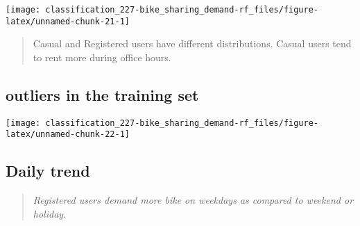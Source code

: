 \documentclass[]{book}
\newenvironment{Shaded}{\begin{snugshade}}{\end{snugshade}}
\newcommand{\CommentTok}[1]{\textcolor[rgb]{0.56,0.35,0.01}{\textit{#1}}}
\newcommand{\DataTypeTok}[1]{\textcolor[rgb]{0.13,0.29,0.53}{#1}}
\newcommand{\DecValTok}[1]{\textcolor[rgb]{0.00,0.00,0.81}{#1}}
\newcommand{\KeywordTok}[1]{\textcolor[rgb]{0.13,0.29,0.53}{\textbf{#1}}}
\newcommand{\NormalTok}[1]{#1}
\newcommand{\OperatorTok}[1]{\textcolor[rgb]{0.81,0.36,0.00}{\textbf{#1}}}
\newcommand{\StringTok}[1]{\textcolor[rgb]{0.31,0.60,0.02}{#1}}
\begin{document}
\begin{center}\texttt{[image: classification\_227-bike\_sharing\_demand-rf\_files/figure-latex/unnamed-chunk-21-1]} \end{center}

\begin{quote}
Casual and Registered users have different distributions. Casual users tend to rent more during office hours.
\end{quote}

\hypertarget{outliers-in-the-training-set}{%
\subsection{outliers in the training set}\label{outliers-in-the-training-set}}

\begin{Shaded}
\end{Shaded}

\begin{center}\texttt{[image: classification\_227-bike\_sharing\_demand-rf\_files/figure-latex/unnamed-chunk-22-1]} \end{center}

\hypertarget{daily-trend}{%
\subsection{Daily trend}\label{daily-trend}}

\begin{quote}
\emph{Registered users demand more bike on weekdays as compared to weekend or holiday.}
\end{quote}

\begin{Shaded}
\end{Shaded}
\end{document}
